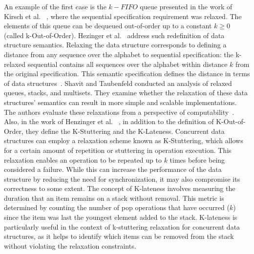 An example of the first case is the \(k-FIFO\) queue presented in the work of Kirsch et al. ~\cite{DBLP_conf_pact_KirschLP13, DBLP_conf_ica3pp_KirschPRS12}, where the sequential specification requirement was relaxed. The elements of this queue can be dequeued out-of-order up to a constant \(k \ge 0\) (called k-Out-of-Order). Hezinger et al.~\cite{DBLP_conf_popl_HenzingerKPSS13} address such redefinition of data structure semantics. Relaxing the data structure corresponds to defining a distance from any sequence over the alphabet to sequential specification: the k-relaxed sequential contains all sequences over the alphabet within distance \(k\) from the original specification. This semantic specification defines the distance in terms of data structures~\cite{DBLP_conf_popl_HenzingerKPSS13}. Shavit and Taubenfeld conducted an analysis of relaxed queues, stacks, and multisets. They examine whether the relaxation of these data structures' semantics can result in more simple and scalable implementations. The authors evaluate these relaxations from a perspective of computability~\cite{DBLP_journals_dc_ShavitT16}. Also, in the work of Henzinger et al. ~\cite{DBLP_conf_popl_HenzingerKPSS13}, in addition to the definition of K-Out-of-Order, they define the K-Stuttering and the K-Lateness. Concurrent data structures can employ a relaxation scheme known as K-Stuttering, which allows for a certain amount of repetition or stuttering in operation execution. This relaxation enables an operation to be repeated up to \(k\) times before being considered a failure. While this can increase the performance of the data structure by reducing the need for synchronization, it may also compromise its correctness to some extent. The concept of K-lateness involves measuring the duration that an item remains on a stack without removal. This metric is determined by counting the number of pop operations that have occurred (\(k\)) since the item was last the youngest element added to the stack. K-lateness is particularly useful in the context of k-stuttering relaxation for concurrent data structures, as it helps to identify which items can be removed from the stack without violating the relaxation constraints.


